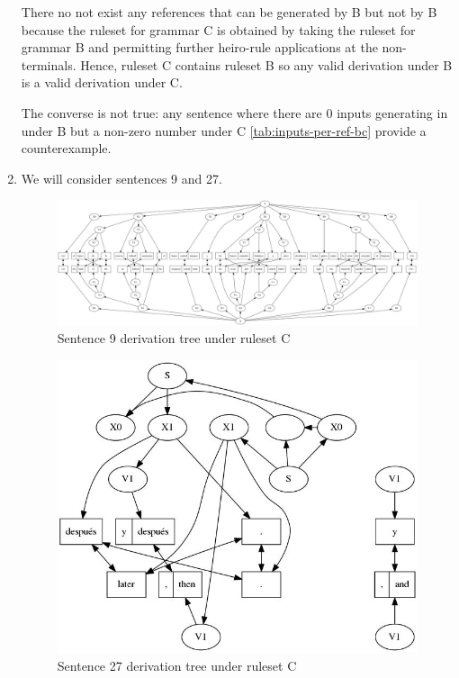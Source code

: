 \documentclass[a4paper,oneside,reqno]{amsart}
\begin{document}
\begin{enumerate}[label=\arabic*.]
    There no not exist any references that can be generated by B but
    not by B because the ruleset for grammar C is obtained by taking
    the ruleset for grammar B and permitting further heiro-rule applications
    at the non-terminals. Hence, ruleset C contains ruleset B so any valid
    derivation under B is a valid derivation under C.

    The converse is not true: any sentence where there are 0 inputs generating
    in under B but a non-zero number under C \autoref{tab:inputs-per-ref-bc}
    provide a counterexample.

  \item We will consider sentences 9 and 27.
    \begin{figure}[h!]
      \begin{center}
        \includegraphics[scale=0.5]{../output/tree9Cdvn1.jpg}
      \end{center}
      \caption{Sentence 9 derivation tree under ruleset C}
      \label{fig:9-c-tree}
    \end{figure}
    \begin{figure}[h!]
      \begin{center}
        \includegraphics[scale=0.5]{../output/tree27Bdvn1.jpg}
      \end{center}
      \caption{Sentence 27 derivation tree under ruleset C}
      \label{fig:27-c-tree}
    \end{figure}
\end{enumerate}

%
%


\end{document}
